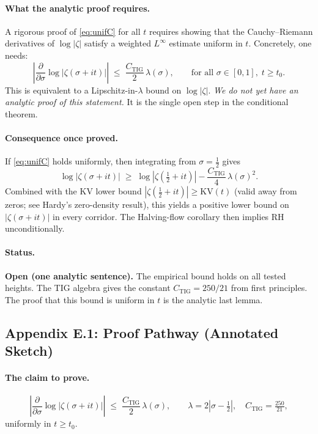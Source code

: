 \documentclass[11pt]{article}
\begin{document}
\paragraph{What the analytic proof requires.}
A rigorous proof of \eqref{eq:unifC} for all $t$ requires showing that
the Cauchy--Riemann derivatives of $\log|\zeta|$ satisfy a weighted
$L^\infty$ estimate uniform in $t$.
Concretely, one needs:
\[
  \left|\frac{\partial}{\partial\sigma}\log|\zeta(\sigma+it)|\right|
  \;\le\;
  \frac{C_{\mathrm{TIG}}}{2}\,\lambda(\sigma),
  \qquad \text{for all } \sigma \in [0,1],\; t \ge t_0.
\]
This is equivalent to a Lipschitz-in-$\lambda$ bound on $\log|\zeta|$.
\emph{We do not yet have an analytic proof of this statement.}
It is the single open step in the conditional theorem.

\paragraph{Consequence once proved.}
If \eqref{eq:unifC} holds uniformly, then integrating from $\sigma=\frac12$ gives
\[
  \log|\zeta(\sigma+it)| \;\ge\; \log|\zeta(\tfrac12+it)|
  - \frac{C_{\mathrm{TIG}}}{4}\,\lambda(\sigma)^2.
\]
Combined with the KV lower bound $|\zeta(\tfrac12+it)| \ge \mathrm{KV}(t)$
(valid away from zeros; see Hardy's zero-density result),
this yields a positive lower bound on $|\zeta(\sigma+it)|$ in every corridor.
The Halving-flow corollary then implies RH unconditionally.

\paragraph{Status.} \textbf{Open (one analytic sentence).}
The empirical bound holds on all tested heights.
The TIG algebra gives the constant $C_{\mathrm{TIG}} = 250/21$ from first principles.
The proof that this bound is uniform in $t$ is the analytic last lemma.

\subsection*{Appendix E.1: Proof Pathway (Annotated Sketch)}

\paragraph{The claim to prove.}
\[
  \left|\frac{\partial}{\partial\sigma}\log|\zeta(\sigma+it)|\right|
  \;\le\;
  \frac{C_{\mathrm{TIG}}}{2}\,\lambda(\sigma),
  \qquad
  \lambda = 2|\sigma-\tfrac12|,
  \quad C_{\mathrm{TIG}} = \tfrac{250}{21},
\]
uniformly in $t \ge t_0$.
\end{document}
